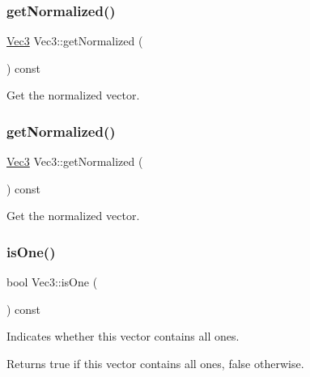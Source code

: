 \subsubsection{\texorpdfstring{get\+Normalized()}{getNormalized()}\hspace{0.1cm}{\footnotesize\ttfamily [1/2]}}
{\footnotesize\ttfamily \hyperlink{classVec3}{Vec3} Vec3\+::get\+Normalized (\begin{DoxyParamCaption}{ }\end{DoxyParamCaption}) const}

Get the normalized vector. \mbox{\label{classVec3_aed345a2ae8ac7a2a76aecf07cec2e0af}} 
\subsubsection{\texorpdfstring{get\+Normalized()}{getNormalized()}\hspace{0.1cm}{\footnotesize\ttfamily [2/2]}}
{\footnotesize\ttfamily \hyperlink{classVec3}{Vec3} Vec3\+::get\+Normalized (\begin{DoxyParamCaption}{ }\end{DoxyParamCaption}) const}

Get the normalized vector. \mbox{\label{classVec3_a8fcba789d88686eeb94336dae1c1deb9}} 
\subsubsection{\texorpdfstring{is\+One()}{isOne()}\hspace{0.1cm}{\footnotesize\ttfamily [1/2]}}
{\footnotesize\ttfamily bool Vec3\+::is\+One (\begin{DoxyParamCaption}{ }\end{DoxyParamCaption}) const\hspace{0.3cm}{\ttfamily [inline]}}

Indicates whether this vector contains all ones.

\begin{DoxyReturn}{Returns}
true if this vector contains all ones, false otherwise. 
\end{DoxyReturn}
\mbox{\label{classVec3_a8fcba789d88686eeb94336dae1c1deb9}} 
